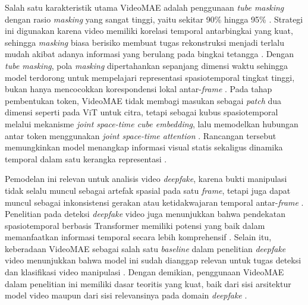 Salah satu karakteristik utama VideoMAE adalah penggunaan \textit{tube masking} dengan rasio \textit{masking} yang sangat tinggi, yaitu sekitar 90\% hingga 95\% \cite{tong2022videomaemaskedautoencodersdataefficient}. Strategi ini digunakan karena video memiliki korelasi temporal antarbingkai yang kuat, sehingga \textit{masking} biasa berisiko membuat tugas rekonstruksi menjadi terlalu mudah akibat adanya informasi yang berulang pada bingkai tetangga \cite{tong2022videomaemaskedautoencodersdataefficient}. Dengan \textit{tube masking}, pola \textit{masking} dipertahankan sepanjang dimensi waktu sehingga model terdorong untuk mempelajari representasi spasiotemporal tingkat tinggi, bukan hanya mencocokkan korespondensi lokal antar-\textit{frame} \cite{tong2022videomaemaskedautoencodersdataefficient}. Pada tahap pembentukan token, VideoMAE tidak membagi masukan sebagai \textit{patch} dua dimensi seperti pada ViT untuk citra, tetapi sebagai kubus spasiotemporal melalui mekanisme \textit{joint space-time cube embedding}, lalu memodelkan hubungan antar token menggunakan \textit{joint space-time attention} \cite{tong2022videomaemaskedautoencodersdataefficient}. Rancangan tersebut memungkinkan model menangkap informasi visual statis sekaligus dinamika temporal dalam satu kerangka representasi \cite{tong2022videomaemaskedautoencodersdataefficient}. \par

Pemodelan ini relevan untuk analisis video \textit{deepfake}, karena bukti manipulasi tidak selalu muncul sebagai artefak spasial pada satu \textit{frame}, tetapi juga dapat muncul sebagai inkonsistensi gerakan atau ketidakwajaran temporal antar-\textit{frame} \cite{Gu2021}\cite{KINGRA2024301817}. Penelitian pada deteksi \textit{deepfake} video juga menunjukkan bahwa pendekatan spasiotemporal berbasis Transformer memiliki potensi yang baik dalam memanfaatkan informasi temporal secara lebih komprehensif \cite{KINGRA2024301817}. Selain itu, keberadaan VideoMAE sebagai salah satu \textit{baseline} dalam penelitian \textit{deepfake} video menunjukkan bahwa model ini sudah dianggap relevan untuk tugas deteksi dan klasifikasi video manipulasi \cite{hu2024delocatedetectionlocalizationdeepfake}. Dengan demikian, penggunaan VideoMAE dalam penelitian ini memiliki dasar teoritis yang kuat, baik dari sisi arsitektur model video maupun dari sisi relevansinya pada domain \textit{deepfake} \cite{tong2022videomaemaskedautoencodersdataefficient}\cite{hu2024delocatedetectionlocalizationdeepfake}\cite{das2024unmaskingdeepfakesmaskedautoencoding}. \par

